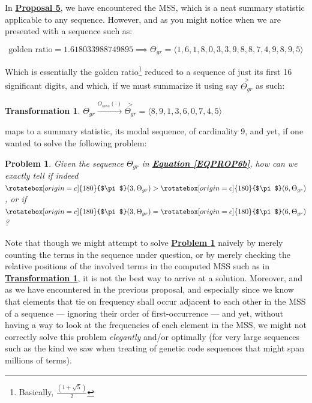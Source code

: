 \documentclass[a4paper, 18pt]{book} %
\newtheorem{trans}{Transformation}
\newtheorem{prob}{Problem}
\newcommand{\invpi}{\rotatebox[origin=c]{180}{$\pi$}}
\begin{document}
\begin{appendices}
In \textbf{\hyperref[PROP5]{Proposal 5}}, we have encountered the MSS, which is a neat summary statistic applicable to any sequence. However, and as you might notice when we are presented with a sequence such as:

\vspace{1em}
\begin{equation}
\label{EQPROP6b}
\text{golden ratio} = 1.618033988749895 \implies \Theta_{gr} = \langle 1, 6, 1, 8, 0, 3, 3, 9, 8, 8, 7, 4, 9, 8, 9, 5 \rangle 
\end{equation}
\vspace{1em}

Which is essentially the golden ratio\footnote{Basically, $\frac{(1 + \sqrt{5})}{2}$} reduced to a sequence of just its first 16 significant digits, and which, if we must summarize it using say $\overset{>}{\Theta_{gr}}$ as such:

\vspace{1em}
\begin{trans}
\label{TRANSMSS1b}
$ \Theta_{gr} \xrightarrow{O_{mss}(\cdot)} \overset{>}{\Theta_{gr}} = \langle 8, 9, 1, 3, 6, 0, 7, 4, 5 \rangle$
\end{trans}
\vspace{1em}

maps to a summary statistic, its modal sequence, of cardinality 9, and yet, if one wanted to solve the following problem:

\vspace{1em}
\begin{prob}
\label{PROBSC1b}
Given the sequence $\Theta_{gr}$ in \textbf{\hyperref[EQPROP6b]{Equation \ref{EQPROP6b}}}, how can we exactly tell if indeed $\invpi(3,\Theta_{gr}) > \invpi(6,\Theta_{gr})$, or if $\invpi(3,\Theta_{gr}) = \invpi(6,\Theta_{gr})$?
\end{prob}
\vspace{1em}


Note that though we might attempt to solve \textbf{\hyperref[PROBSC1b]{Problem \ref{PROBSC1b}}} naively by merely counting the terms in the sequence under question, or by merely checking the relative positions of the involved terms in the computed MSS such as in \textbf{\hyperref[TRANSMSS1b]{Transformation \ref{TRANSMSS1b}}}, it is not the best way to arrive at a solution. Moreover, and as we have encountered in the previous proposal, and especially since we know that elements that tie on frequency shall occur adjacent to each other in the MSS of a sequence --- ignoring their order of first-occurrence --- and yet, without having a way to look at the frequencies of each element in the MSS, we might not correctly solve this problem \textit{elegantly} and/or optimally (for very large sequences such as the kind we saw when treating of genetic code sequences\cite{lutalo_2025_trans_genetics} that might span millions of terms). 


\end{appendices}
\end{document}
